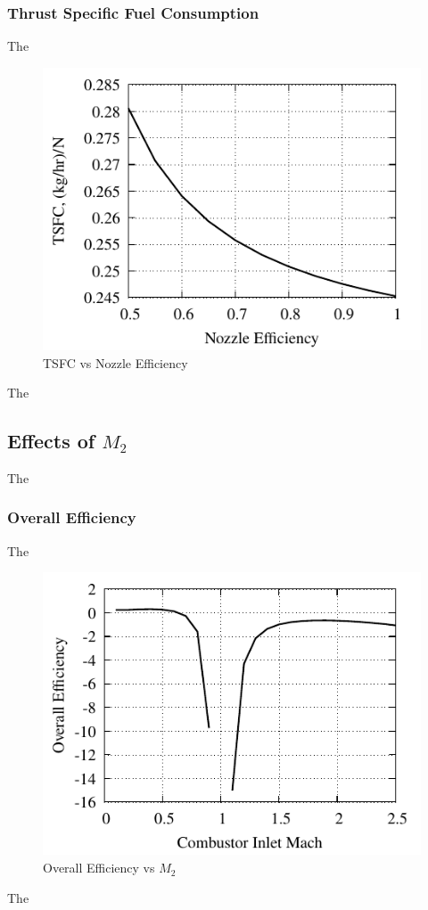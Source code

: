 \documentclass[conf]{new-aiaa} %
\begin{document}
\subsubsection{Thrust Specific Fuel Consumption}
The

\begin{figure}[H] %
    \centering
    \includegraphics[]{media/performance_parameter_files/part_g_TSFC.pdf}
    \caption{\label{fig:partgtsfc}TSFC vs Nozzle Efficiency}
\end{figure}
The

\subsection{Effects of \texorpdfstring{$M_2$}{M2}} %
The

\subsubsection{Overall Efficiency}
The

\begin{figure}[H] %
    \centering
    \includegraphics[]{media/performance_parameter_files/part_h_eta_o.pdf}
    \caption{\label{fig:parthetao}Overall Efficiency vs \texorpdfstring{\textit{$M_2$}}{M2}}
\end{figure}
The
\end{document}
